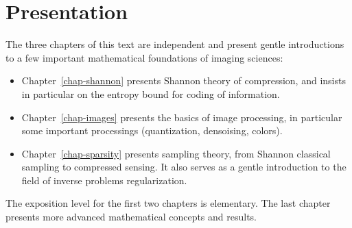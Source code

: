 
\chapter*{Presentation}


The three chapters of this text are independent and present gentle introductions to a few important mathematical foundations of imaging sciences:
\begin{itemize}
	\item Chapter~\ref{chap-shannon} presents Shannon theory of compression, and insists in particular on the entropy bound for coding of information.
	\item Chapter~\ref{chap-images} presents the basics of image processing, in particular some important processings (quantization, densoising, colors).
	\item Chapter~\ref{chap-sparsity} presents sampling theory, from Shannon classical sampling to compressed sensing. It also serves as a gentle introduction to the field of inverse problems regularization.
\end{itemize}
The exposition level for the first two chapters is elementary. The last chapter presents more advanced mathematical concepts and results. 


\tableofcontents